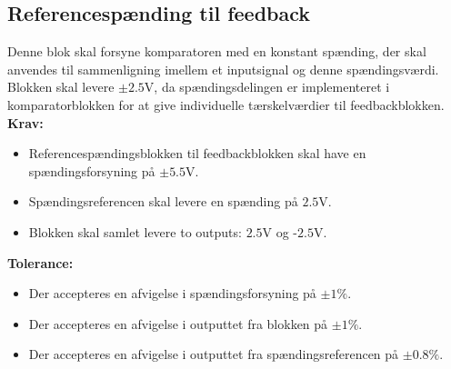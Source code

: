 \subsection{Referencespænding til feedback}\label{Ref_Kompar_Afs}
Denne blok skal forsyne komparatoren med en konstant spænding, der skal anvendes til sammenligning imellem et inputsignal og denne spændingsværdi.
Blokken skal levere $\pm2.5$V, da spændingsdelingen er implementeret i komparatorblokken for at give individuelle tærskelværdier til feedbackblokken. \\ 
\noindent\textbf{Krav:}
\begin{itemize}
	\item Referencespændingsblokken til feedbackblokken skal have en spændingsforsyning på $\pm5.5$V.
	\item Spændingsreferencen skal levere en spænding på $2.5$V.
	\item Blokken skal samlet levere to outputs: $2.5$V og -$2.5$V.
\end{itemize}
\noindent \textbf{Tolerance:}
\begin{itemize}
	\item Der accepteres en afvigelse i spændingsforsyning på $\pm1\%$.
	\item Der accepteres en afvigelse i outputtet fra blokken på $\pm1\%$.
	\item Der accepteres en afvigelse i outputtet fra spændingsreferencen på $\pm0.8\%$. 
\end{itemize}
